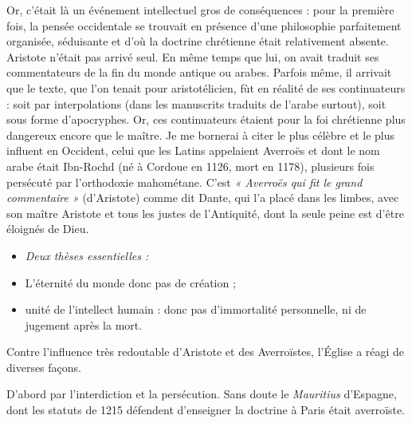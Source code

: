 \documentclass[french,twoside]{book} %
\newlength{\listmod}
\newcommand{\listhead}[1]{\hspace{-1\listmod}\emph{#1}}
\begin{document}
Or, c’était là un événement intellectuel gros de conséquences : pour la première fois, la pensée occidentale se trouvait en présence d’une philosophie parfaitement organisée, séduisante et d’où la doctrine chrétienne était relativement absente. Aristote n’était pas arrivé seul. En même temps que lui, on avait traduit ses commentateurs de la fin du monde antique ou arabes. Parfois même, il arrivait que le texte, que l’on tenait pour aristotélicien, fùt en réalité de ses continuateurs : soit par interpolations (dans les manuscrits traduits de l’arabe surtout), soit sous forme d’apocryphes. Or, ces continuateurs étaient pour la foi chrétienne plus dangereux encore que le maître. Je me bornerai à citer le plus célèbre et le plus influent en Occident, celui que les Latins appelaient Averroës et dont le nom arabe était Ibn-Rochd (né à Cordoue en 1126, mort en 1178), plusieurs fois persécuté par l’orthodoxie mahométane. C’est \emph{« Averroës qui fit le grand commentaire »} (d’Aristote) comme dit Dante, qui l’a placé dans les limbes, avec son maître Aristote et tous les justes de l’Antiquité, dont la seule peine est d’être éloignés de Dieu.\par

\begin{itemize}[itemsep=0pt,]
\item[]\listhead{Deux thèses essentielles :}
\item L’éternité du monde donc pas de création ;
\item unité de l’intellect humain : donc pas d’immortalité personnelle, ni de jugement après la mort.
\end{itemize}
\noindent Contre l’influence très redoutable d’Aristote et des Averroïstes, l’Église a réagi de diverses façons.\par
D’abord par l’interdiction et la persécution. Sans doute le \emph{Mauritius} d’Espagne, dont les statuts de 1215 défendent d’enseigner la doctrine à Paris était averroïste.\par
\end{document}
